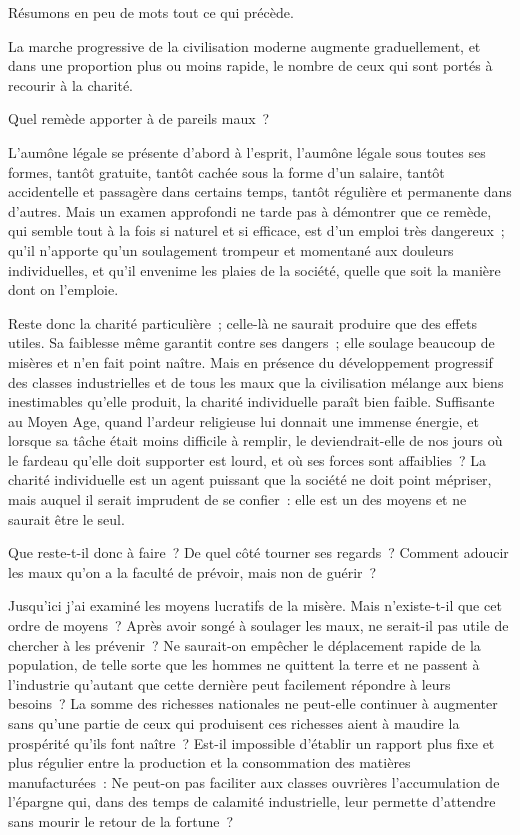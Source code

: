 \documentclass[french,twoside]{book} %
\begin{document}
\noindent Résumons en peu de mots tout ce qui précède.\par
La marche progressive de la civilisation moderne augmente graduellement, et dans une proportion plus ou moins rapide, le nombre de ceux qui sont portés à recourir à la charité.\par
Quel remède apporter à de pareils maux ?\par
L'aumône légale se présente d’abord à l’esprit, l’aumône légale sous toutes ses formes, tantôt gratuite, tantôt cachée sous la forme d’un salaire, tantôt accidentelle et passagère dans certains temps, tantôt régulière et permanente dans d’autres. Mais un examen approfondi ne tarde pas à démontrer que ce remède, qui semble tout à la fois si naturel et si efficace, est d’un emploi très dangereux ; qu’il n’apporte qu’un soulagement trompeur et momentané aux douleurs individuelles, et qu’il envenime les plaies de la société, quelle que soit la manière dont on l’emploie.\par
Reste donc la charité particulière ; celle-là ne saurait produire que des effets utiles. Sa faiblesse même garantit contre ses dangers ; elle soulage beaucoup de misères et n’en fait point naître. Mais en présence du développement progressif des classes industrielles et de tous les maux que la civilisation mélange aux biens inestimables qu’elle produit, la charité individuelle paraît bien faible. Suffisante au Moyen Age, quand l’ardeur religieuse lui donnait une immense énergie, et lorsque sa tâche était moins difficile à remplir, le deviendrait-elle de nos jours où le fardeau qu’elle doit supporter est lourd, et où ses forces sont affaiblies ? La charité individuelle est un agent puissant que la société ne doit point mépriser, mais auquel il serait imprudent de se confier : elle est un des moyens et ne saurait être le seul.\par
Que reste-t-il donc à faire ? De quel côté tourner ses regards ? Comment adoucir les maux qu’on a la faculté de prévoir, mais non de guérir ?\par
Jusqu’ici j’ai examiné les moyens lucratifs de la misère. Mais n’existe-t-il que cet ordre de moyens ? Après avoir songé à soulager les maux, ne serait-il pas utile de chercher à les prévenir ? Ne saurait-on empêcher le déplacement rapide de la population, de telle sorte que les hommes ne quittent la terre et ne passent à l’industrie qu’autant que cette dernière peut facilement répondre à leurs besoins ? La somme des richesses nationales ne peut-elle continuer à augmenter sans qu’une partie de ceux qui produisent ces richesses aient à maudire la prospérité qu’ils font naître ? Est-il impossible d’établir un rapport plus fixe et plus régulier entre la production et la consommation des matières manufacturées : Ne peut-on pas faciliter aux classes ouvrières l’accumulation de l’épargne qui, dans des temps de calamité industrielle, leur permette d’attendre sans mourir le retour de la fortune ?\par
\end{document}
